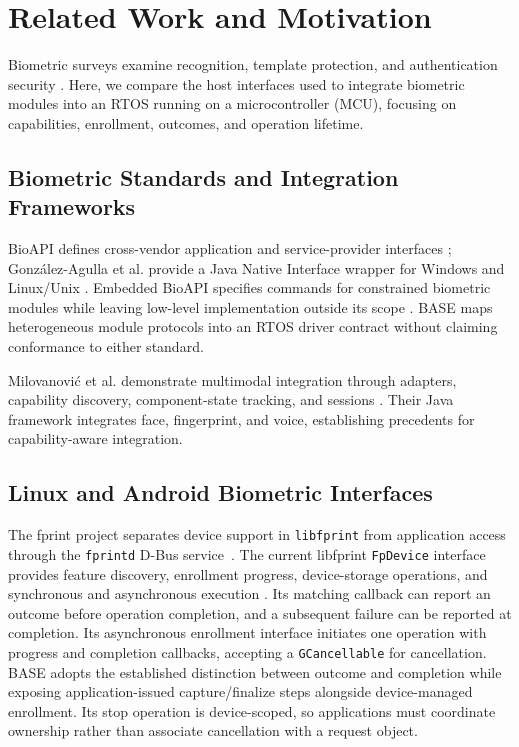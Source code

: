 \section{Related Work and Motivation}
\label{sec:related_work}

Biometric surveys examine recognition, template protection, and authentication security \cite{yang2021biometric,ahvanooey2022modern}. Here, we compare the host interfaces used to integrate biometric modules into an RTOS running on a microcontroller (MCU), focusing on capabilities, enrollment, outcomes, and operation lifetime.

\subsection{Biometric Standards and Integration Frameworks}

BioAPI defines cross-vendor application and service-provider interfaces \cite{iso19784}; Gonz\'{a}lez-Agulla et al. provide a Java Native Interface wrapper for Windows and Linux/Unix \cite{gonzalezagulla2009bioapi}. Embedded BioAPI specifies commands for constrained biometric modules while leaving low-level implementation outside its scope \cite{iso29164}. BASE maps heterogeneous module protocols into an RTOS driver contract without claiming conformance to either standard.

Milovanovi\'{c} et al. demonstrate multimodal integration through adapters, capability discovery, component-state tracking, and sessions \cite{milovanovic2012interoperability}. Their Java framework integrates face, fingerprint, and voice, establishing precedents for capability-aware integration.

\subsection{Linux and Android Biometric Interfaces}

The fprint project separates device support in \texttt{libfprint} from application access through the \texttt{fprintd} D-Bus service~\cite{libfprint_device_api,fprintd_device_api}. The current libfprint \texttt{FpDevice} interface provides feature discovery, enrollment progress, device-storage operations, and synchronous and asynchronous execution \cite{libfprint_device_api}. Its matching callback can report an outcome before operation completion, and a subsequent failure can be reported at completion. Its asynchronous enrollment interface initiates one operation with progress and completion callbacks, accepting a \texttt{GCancellable} for cancellation. BASE adopts the established distinction between outcome and completion while exposing application-issued capture/finalize steps alongside device-managed enrollment. Its stop operation is device-scoped, so applications must coordinate ownership rather than associate cancellation with a request object.

